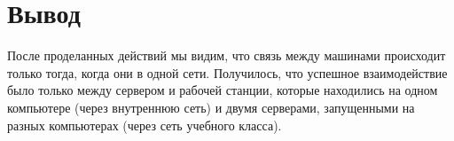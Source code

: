 \documentclass[a4paper,12pt]{article}
\begin{document}
\section*{Вывод}

После проделанных действий мы видим, что связь между машинами происходит только тогда, 
когда они в одной сети. Получилось, что успешное взаимодействие было только между сервером и
рабочей станции, которые находились на одном компьютере (через внутреннюю сеть) и двумя серверами, 
запущенными на разных компьютерах (через сеть учебного класса).
\end{document}

